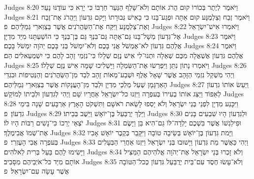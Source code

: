 Judges 8:20	וַיֹּאמֶר לְיֶתֶר בְּכוֹרוֹ קוּם הֲרֹג אוֹתָם וְלֹא־שָׁלַף הַנַּעַר חַרְבּוֹ כִּי יָרֵא כִּי עוֹדֶנּוּ נָעַר׃
Judges 8:21	וַיֹּאמֶר זֶבַח וְצַלְמֻנָּע קוּם אַתָּה וּפְגַע־בָּנוּ כִּי כָאִישׁ גְּבוּרָתוֹ וַיָּקם גִּדְעוֹן וַיַּהֲרֹג אֶת־זֶבַח וְאֶת־צַלְמֻנָּע וַיִּקַּח אֶת־הַשַּׂהֲרֹנִים אֲשֶׁר בְּצַוְּארֵי גְמַלֵּיהֶם׃ {פ}
Judges 8:22	וַיֹּאמְרוּ אִישׁ־יִשְׂרָאֵל אֶל־גִּדְעוֹן מְשָׁל־בָּנוּ גַּם־אַתָּה גַּם־בִּנְךָ גַּם בֶּן־בְּנֶךָ כִּי הוֹשַׁעְתָּנוּ מִיַּד מִדְיָן׃
Judges 8:23	וַיֹּאמֶר אֲלֵהֶם גִּדְעוֹן לֹא־אֶמְשֹׁל אֲנִי בָּכֶם וְלֹא־יִמְשֹׁל בְּנִי בָּכֶם יְהֹוָה יִמְשֹׁל בָּכֶם׃
Judges 8:24	וַיֹּאמֶר אֲלֵהֶם גִּדְעוֹן אֶשְׁאֲלָה מִכֶּם שְׁאֵלָה וּתְנוּ־לִי אִישׁ נֶזֶם שְׁלָלוֹ כִּי־נִזְמֵי זָהָב לָהֶם כִּי יִשְׁמְעֵאלִים הֵם׃
Judges 8:25	וַיֹּאמְרוּ נָתוֹן נִתֵּן וַיִּפְרְשׂוּ אֶת־הַשִּׂמְלָה וַיַּשְׁלִיכוּ שָׁמָּה אִישׁ נֶזֶם שְׁלָלוֹ׃
Judges 8:26	וַיְהִי מִשְׁקַל נִזְמֵי הַזָּהָב אֲשֶׁר שָׁאָל אֶלֶף וּשְׁבַע־מֵאוֹת זָהָב לְבַד מִן־הַשַּׂהֲרֹנִים וְהַנְּטִיפוֹת וּבִגְדֵי הָאַרְגָּמָן שֶׁעַל מַלְכֵי מִדְיָן וּלְבַד מִן־הָעֲנָקוֹת אֲשֶׁר בְּצַוְּארֵי גְמַלֵּיהֶם׃
Judges 8:27	וַיַּעַשׂ אוֹתוֹ גִדְעוֹן לְאֵפוֹד וַיַּצֵּג אוֹתוֹ בְעִירוֹ בְּעפְרָה וַיִּזְנוּ כל־יִשְׂרָאֵל אַחֲרָיו שָׁם וַיְהִי לְגִדְעוֹן וּלְבֵיתוֹ לְמוֹקֵשׁ׃
Judges 8:28	וַיִּכָּנַע מִדְיָן לִפְנֵי בְּנֵי יִשְׂרָאֵל וְלֹא יָסְפוּ לָשֵׂאת רֹאשָׁם וַתִּשְׁקֹט הָאָרֶץ אַרְבָּעִים שָׁנָה בִּימֵי גִדְעוֹן׃ {פ}
Judges 8:29	וַיֵּלֶךְ יְרֻבַּעַל בֶּן־יוֹאָשׁ וַיֵּשֶׁב בְּבֵיתוֹ׃
Judges 8:30	וּלְגִדְעוֹן הָיוּ שִׁבְעִים בָּנִים יֹצְאֵי יְרֵכוֹ כִּי־נָשִׁים רַבּוֹת הָיוּ לוֹ׃
Judges 8:31	וּפִילַגְשׁוֹ אֲשֶׁר בִּשְׁכֶם יָלְדָה־לּוֹ גַם־הִיא בֵּן וַיָּשֶׂם אֶת־שְׁמוֹ אֲבִימֶלֶךְ׃
Judges 8:32	וַיָּמת גִּדְעוֹן בֶּן־יוֹאָשׁ בְּשֵׂיבָה טוֹבָה וַיִּקָּבֵר בְּקֶבֶר יוֹאָשׁ אָבִיו בְּעפְרָה אֲבִי הָעֶזְרִי׃ {פ}
Judges 8:33	וַיְהִי כַּאֲשֶׁר מֵת גִּדְעוֹן וַיָּשׁוּבוּ בְּנֵי יִשְׂרָאֵל וַיִּזְנוּ אַחֲרֵי הַבְּעָלִים וַיָּשִׂימוּ לָהֶם בַּעַל בְּרִית לֵאלֹהִים׃
Judges 8:34	וְלֹא זָכְרוּ בְּנֵי יִשְׂרָאֵל אֶת־יְהֹוָה אֱלֹהֵיהֶם הַמַּצִּיל אוֹתָם מִיַּד כּל־אֹיְבֵיהֶם מִסָּבִיב׃
Judges 8:35	וְלֹא־עָשׂוּ חֶסֶד עִם־בֵּית יְרֻבַּעַל גִּדְעוֹן כְּכל־הַטּוֹבָה אֲשֶׁר עָשָׂה עִם־יִשְׂרָאֵל׃ {פ}
